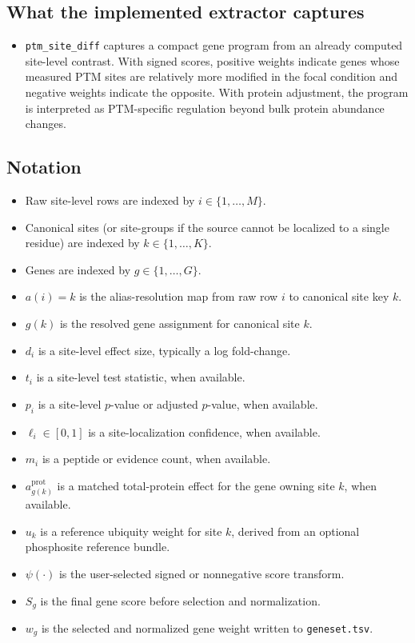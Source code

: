 \documentclass[11pt]{article}
\begin{document}
\subsection{What the implemented extractor captures}
\begin{itemize}
\item \texttt{ptm\_site\_diff} captures a compact gene program from an already
computed site-level contrast. With signed scores, positive weights indicate
genes whose measured PTM sites are relatively more modified in the focal
condition and negative weights indicate the opposite. With protein adjustment,
the program is interpreted as PTM-specific regulation beyond bulk protein
abundance changes.
\end{itemize}

\subsection{Notation}
\begin{itemize}
\item Raw site-level rows are indexed by $i \in \{1,\ldots,M\}$.
\item Canonical sites (or site-groups if the source cannot be localized to a
single residue) are indexed by $k \in \{1,\ldots,K\}$.
\item Genes are indexed by $g \in \{1,\ldots,G\}$.
\item $a(i) = k$ is the alias-resolution map from raw row $i$ to canonical site
key $k$.
\item $g(k)$ is the resolved gene assignment for canonical site $k$.
\item $d_i$ is a site-level effect size, typically a log fold-change.
\item $t_i$ is a site-level test statistic, when available.
\item $p_i$ is a site-level $p$-value or adjusted $p$-value, when available.
\item $\ell_i \in [0,1]$ is a site-localization confidence, when available.
\item $m_i$ is a peptide or evidence count, when available.
\item $a_{g(k)}^{\mathrm{prot}}$ is a matched total-protein effect for the gene
owning site $k$, when available.
\item $u_k$ is a reference ubiquity weight for site $k$, derived from an
optional phosphosite reference bundle.
\item $\psi(\cdot)$ is the user-selected signed or nonnegative score transform.
\item $S_g$ is the final gene score before selection and normalization.
\item $w_g$ is the selected and normalized gene weight written to
\texttt{geneset.tsv}.
\end{itemize}
\end{document}
